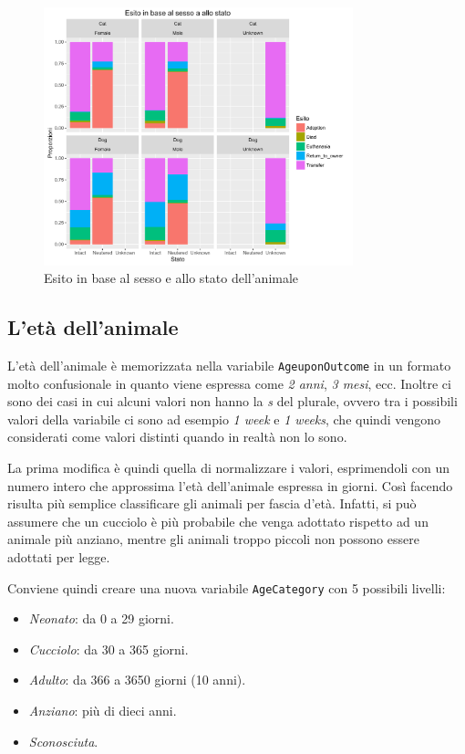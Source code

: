\begin{figure}[htbp]
	\centering
	\includegraphics[width=0.8\textwidth]{./grafici/esito_sesso_stato.pdf}
	\caption{Esito in base al sesso e allo stato dell'animale}\label{fig-sesso-stato}
\end{figure}

\subsection{L'età dell'animale}

L'età dell'animale è memorizzata nella variabile \texttt{AgeuponOutcome} in un formato molto confusionale in quanto viene espressa come \textit{2 anni}, \textit{3 mesi}, ecc. Inoltre ci sono dei casi in cui alcuni valori non hanno la \textit{s} del plurale, ovvero tra i possibili valori della variabile ci sono ad esempio \textit{1 week} e \textit{1 weeks}, che quindi vengono considerati come valori distinti quando in realtà non lo sono.

La prima modifica è quindi quella di normalizzare i valori, esprimendoli con un numero intero che approssima l'età dell'animale espressa in giorni. Così facendo risulta più semplice classificare gli animali per fascia d'età. Infatti, si può assumere che un cucciolo è più probabile che venga adottato rispetto ad un animale più anziano, mentre gli animali troppo piccoli non possono essere adottati per legge.

Conviene quindi creare una nuova variabile \texttt{AgeCategory} con 5 possibili livelli:

\begin{itemize}
	\item \textit{Neonato}: da 0 a 29 giorni.
	\item \textit{Cucciolo}: da 30 a 365 giorni.
	\item \textit{Adulto}: da 366 a 3650 giorni (10 anni).
	\item \textit{Anziano}: più di dieci anni.
	\item \textit{Sconosciuta}.
\end{itemize}

